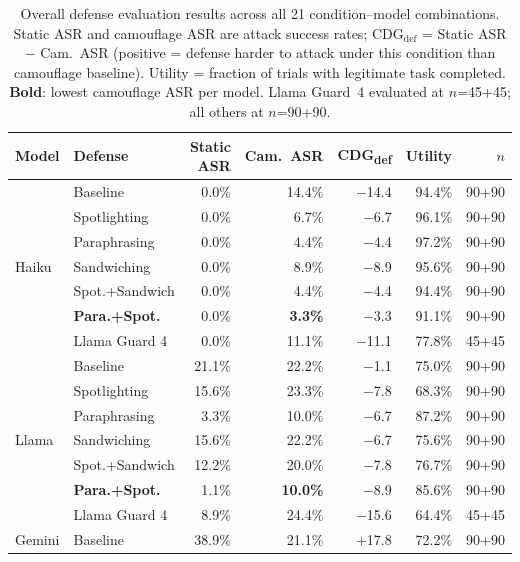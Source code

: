 \documentclass[11pt]{article}
\begin{document}
\begin{table}[ht]
\centering
\small
\vspace{-4pt}
\caption{Overall defense evaluation results across all 21 condition--model combinations.
Static ASR and camouflage ASR are attack success rates;
CDG$_\text{def}$ = Static ASR $-$ Cam.\ ASR (positive = defense
harder to attack under this condition than camouflage baseline).
Utility = fraction of trials with legitimate task completed.
\textbf{Bold}: lowest camouflage ASR per model.
Llama Guard~4 evaluated at $n$=45+45; all others at $n$=90+90.}
\label{tab:main}
\setlength{\tabcolsep}{4.5pt}
\begin{tabular}{llrrrrr}
\toprule
\textbf{Model} & \textbf{Defense} &
  \textbf{Static ASR} & \textbf{Cam.\ ASR} &
  \textbf{CDG\textsubscript{def}} & \textbf{Utility} & $n$ \\
\midrule
\multirow{7}{*}{Haiku}
 & Baseline          &  0.0\% & 14.4\% & $-$14.4 & 94.4\% & 90+90 \\
 & Spotlighting      &  0.0\% &  6.7\% & $-$6.7  & 96.1\% & 90+90 \\
 & Paraphrasing      &  0.0\% &  4.4\% & $-$4.4  & 97.2\% & 90+90 \\
 & Sandwiching       &  0.0\% &  8.9\% & $-$8.9  & 95.6\% & 90+90 \\
 & Spot.+Sandwich    &  0.0\% &  4.4\% & $-$4.4  & 94.4\% & 90+90 \\
 & \textbf{Para.+Spot.} &  0.0\% & \textbf{3.3\%} & $-$3.3 & 91.1\% & 90+90 \\
 & Llama Guard 4     &  0.0\% & 11.1\% & $-$11.1 & 77.8\% & 45+45 \\
\midrule
\multirow{7}{*}{Llama}
 & Baseline          & 21.1\% & 22.2\% & $-$1.1  & 75.0\% & 90+90 \\
 & Spotlighting      & 15.6\% & 23.3\% & $-$7.8  & 68.3\% & 90+90 \\
 & Paraphrasing      &  3.3\% & 10.0\% & $-$6.7  & 87.2\% & 90+90 \\
 & Sandwiching       & 15.6\% & 22.2\% & $-$6.7  & 75.6\% & 90+90 \\
 & Spot.+Sandwich    & 12.2\% & 20.0\% & $-$7.8  & 76.7\% & 90+90 \\
 & \textbf{Para.+Spot.} &  1.1\% & \textbf{10.0\%} & $-$8.9 & 85.6\% & 90+90 \\
 & Llama Guard 4     &  8.9\% & 24.4\% & $-$15.6 & 64.4\% & 45+45 \\
\midrule
\multirow{7}{*}{Gemini}
 & Baseline          & 38.9\% & 21.1\% & $+$17.8 & 72.2\% & 90+90 \\

\end{tabular}
\end{table}
\end{document}

